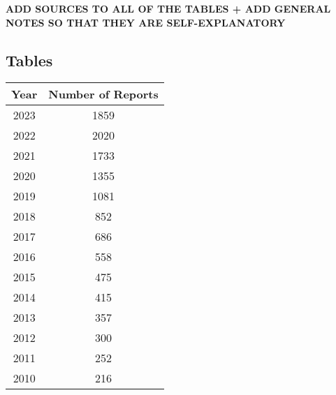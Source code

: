 \documentclass[12pt]{article}
\begin{document}
\textbf{ADD SOURCES TO ALL OF THE TABLES + ADD GENERAL NOTES SO THAT THEY ARE SELF-EXPLANATORY}

\subsection{Tables}\label{app:data:tabs}
\small
\centering

\begin{table}[h]
    \label{tab:sust_reps}
    \centering
        \begin{tabular}{cc}
            \toprule
            Year & Number of Reports\\
            \midrule
            2023 & 1859\\
            2022 & 2020\\
            2021 & 1733\\
            2020 & 1355\\
            2019 & 1081\\
            2018 & 852\\
            2017 & 686\\
            2016 & 558\\
            2015 & 475\\
            2014 & 415\\
            2013 & 357\\
            2012 & 300\\
            2011 & 252\\
            2010 & 216\\
            \bottomrule
        \end{tabular}
\end{table}

\pagebreak
\end{document}
